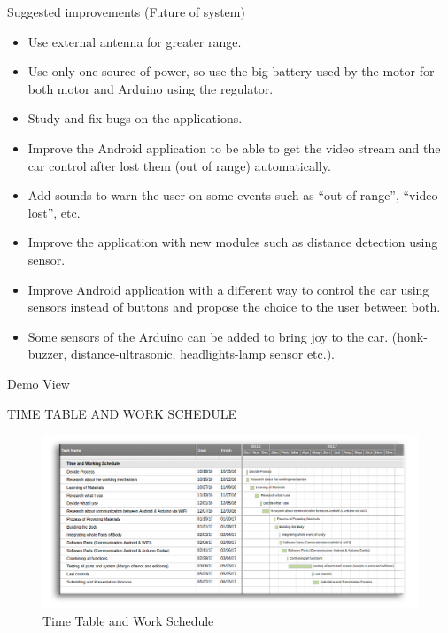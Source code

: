 \documentclass[xcolor=table, 9pt]{beamer}
\begin{document}
\begin{frame}{Suggested improvements (Future of system)}
\begin{itemize}
\item Use external antenna for greater range.
\vspace{0.1cm}
\item Use only one source of power, so use the big battery used by the motor for both motor and Arduino
using the regulator.
\vspace{0.1cm}
\item Study and fix bugs on the applications.
\vspace{0.1cm}
\item Improve the Android application to be able to get the video stream and the car control after lost them (out of range) automatically.
\vspace{0.1cm}
\item Add sounds to warn the user on some events such as “out of range”, “video lost”, etc.
\vspace{0.1cm}
\item Improve the application with new modules such as distance detection using sensor.
\vspace{0.1cm}
\item Improve Android application with a different way to control the car using sensors instead of buttons and propose the choice to the user between both.
\vspace{0.1cm}
\item Some sensors of the Arduino can be added to bring joy to the car. (honk-buzzer, distance-ultrasonic, headlights-lamp sensor etc.).
\end{itemize}

\end{frame}




\begin{frame}{Demo View}
\begin{center}
\end{center}
\end{frame}



\begin{frame}{TIME TABLE AND WORK SCHEDULE}
\begin{figure}
\includegraphics[width=1\linewidth]{ganttChart.png}
\caption{Time Table and Work Schedule}
\end{figure}
\end{frame}
\end{document}
